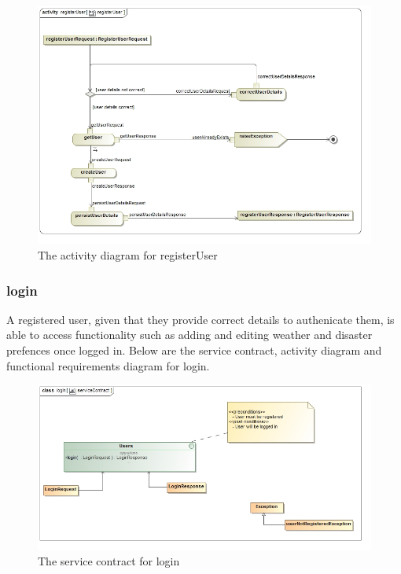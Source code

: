 \begin{figure}[H]
	\centering
	\includegraphics[width=1.0\textwidth]{../images/funcReq/registerUserActivityDiagram.jpg}
	\caption{The activity diagram for registerUser \label{overflow}}
\end{figure}

\subsubsection{login}

A registered user, given that they provide correct details to authenicate them, is able to access functionality such as adding and editing weather and disaster prefences once logged in. Below are the service contract, activity diagram and functional requirements diagram for login.

\begin{figure}[H]
	\centering
	\includegraphics[width=1.0\textwidth]{../images/funcReq/loginServiceContract.jpg}
	\caption{The service contract for login \label{overflow}}
\end{figure}

